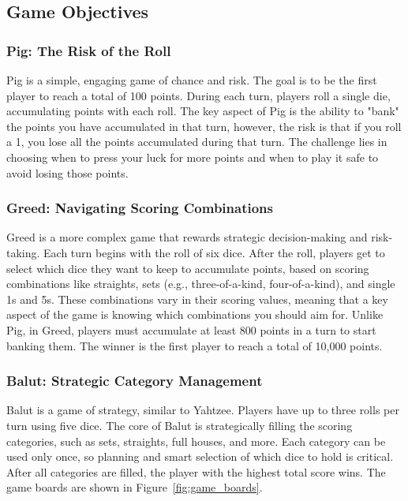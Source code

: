 \subsection{Game Objectives}

\subsubsection{Pig: The Risk of the Roll}

Pig is a simple, engaging game of chance and risk. The goal is to be the first player to reach a total of 100 points. During each turn, players roll a single die, accumulating points with each roll. The key aspect of Pig is the ability to "bank" the points you have accumulated in that turn, however, the risk is that if you roll a 1, you lose all the points accumulated during that turn. The challenge lies in choosing when to press your luck for more points and when to play it safe to avoid losing those points.

\subsubsection{Greed: Navigating Scoring Combinations}

Greed is a more complex game that rewards strategic decision-making and risk-taking. Each turn begins with the roll of six dice. After the roll, players get to select which dice they want to keep to accumulate points, based on scoring combinations like straights, sets (e.g., three-of-a-kind, four-of-a-kind), and single 1s and 5s. These combinations vary in their scoring values, meaning that a key aspect of the game is knowing which combinations you should aim for. Unlike Pig, in Greed, players must accumulate at least 800 points in a turn to start banking them. The winner is the first player to reach a total of 10,000 points.

\subsubsection{Balut: Strategic Category Management}

Balut is a game of strategy, similar to Yahtzee. Players have up to three rolls per turn using five dice. The core of Balut is strategically filling the scoring categories, such as sets, straights, full houses, and more. Each category can be used only once, so planning and smart selection of which dice to hold is critical. After all categories are filled, the player with the highest total score wins. The game boards are shown in Figure~\ref{fig:game_boards}.

